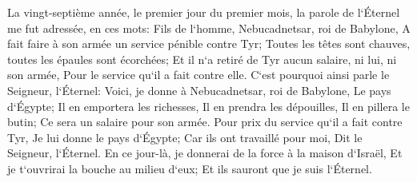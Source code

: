 \verse La vingt-septième année, le premier jour du premier mois, la parole de l`Éternel me fut adressée, en ces mots: 
\verse Fils de l`homme, Nebucadnetsar, roi de Babylone, A fait faire à son armée un service pénible contre Tyr; Toutes les têtes sont chauves, toutes les épaules sont écorchées; Et il n`a retiré de Tyr aucun salaire, ni lui, ni son armée, Pour le service qu`il a fait contre elle. 
\verse C`est pourquoi ainsi parle le Seigneur, l`Éternel: Voici, je donne à Nebucadnetsar, roi de Babylone, Le pays d`Égypte; Il en emportera les richesses, Il en prendra les dépouilles, Il en pillera le butin; Ce sera un salaire pour son armée. 
\verse Pour prix du service qu`il a fait contre Tyr, Je lui donne le pays d`Égypte; Car ils ont travaillé pour moi, Dit le Seigneur, l`Éternel. 
\verse En ce jour-là, je donnerai de la force à la maison d`Israël, Et je t`ouvrirai la bouche au milieu d`eux; Et ils sauront que je suis l`Éternel. 

\chapter{}

